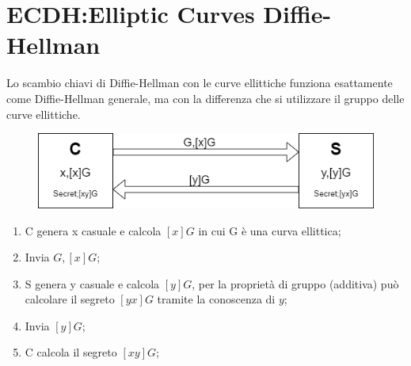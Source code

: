 \documentclass{book}
\begin{document}
\section{ECDH:Elliptic Curves Diffie-Hellman}
Lo scambio chiavi di Diffie-Hellman con le curve ellittiche funziona esattamente come Diffie-Hellman generale, ma con la differenza che si utilizzare il gruppo delle curve ellittiche.
\vspace*{0.5cm}
\begin{figure}[ht]
	\centering
	\includegraphics[scale=0.7]{ECDH.png}
\end{figure}
\begin{enumerate}
	\item C genera x casuale e calcola \([x]G\) in cui G è una curva ellittica;
	\item Invia \(G,[x]G\);
	\item S genera y casuale e calcola \([y]G\), per la proprietà di gruppo (additiva) può calcolare il segreto \([yx]G\) tramite la conoscenza di \(y\);
	\item Invia \([y]G\);
	\item C calcola il segreto \([xy]G\);
\end{enumerate}
\end{document}
